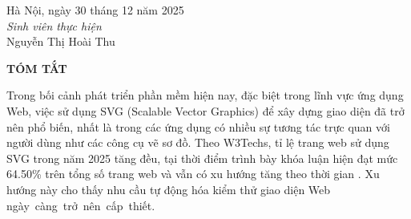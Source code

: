 \documentclass[a4paper, 12pt]{report}
\begin{document}

\vspace{1cm}
\begin{flushright}
\begin{minipage}{0.4\textwidth}
\centering
Hà Nội, ngày 30 tháng 12 năm 2025
\\
\textit{Sinh viên thực hiện}\\[6ex]
Nguyễn Thị Hoài Thu
\end{minipage}
\end{flushright}


\newpage

\changefontsizes[16pt]{13pt}
\begin{center}
    {\fontsize{14pt}{16pt}\selectfont \textbf{TÓM TẮT}}
\end{center}



Trong bối cảnh phát triển phần mềm hiện nay, đặc biệt trong lĩnh vực ứng dụng Web, việc sử dụng SVG (Scalable Vector Graphics) để xây dựng giao diện đã trở nên phổ biến, nhất là trong các ứng dụng có nhiều sự tương tác trực quan với người dùng như các công cụ vẽ sơ đồ. Theo W3Techs, tỉ lệ trang web sử dụng SVG trong năm 2025 tăng đều, tại thời điểm trình bày khóa luận hiện đạt mức 64.50\% trên tổng số trang web và vẫn có xu hướng tăng theo thời gian \cite{w3techs_svg}. Xu hướng này cho thấy nhu cầu tự động hóa kiểm thử giao diện Web ngày~càng~trở~nên~cấp~thiết.
\end{document}
